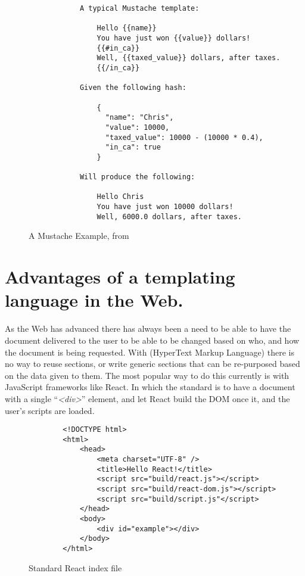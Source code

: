 \begin{figure}[ht!]
    \small
    \begin{verbatim}
            A typical Mustache template:

                Hello {{name}}
                You have just won {{value}} dollars!
                {{#in_ca}}
                Well, {{taxed_value}} dollars, after taxes.
                {{/in_ca}}

            Given the following hash:

                {
                  "name": "Chris",
                  "value": 10000,
                  "taxed_value": 10000 - (10000 * 0.4),
                  "in_ca": true
                }

            Will produce the following:

                Hello Chris
                You have just won 10000 dollars!
                Well, 6000.0 dollars, after taxes.
    \end{verbatim}
    \caption{A Mustache Example, from \parencite{MustacheMan}}
    \label{fig:mustacheEx}
\end{figure}
\clearpage



\section{Advantages of a templating language in the Web.}
As the Web has advanced there has always been a need to be able to have the document delivered to the user to be able to be changed based on who, and how the document is being requested. With (HyperText Markup Language) there is no way to reuse sections, or write generic sections that can be re-purposed based on the data given to them. The most popular way to do this currently is with JavaScript frameworks like React. In which the standard is to have a  document with a single ``\textit{<div>}'' element, and let React build the DOM once it, and the user's scripts are loaded.

\begin{figure}[ht!]
    \small
    \begin{verbatim}
        <!DOCTYPE html>
        <html>
            <head>
                <meta charset="UTF-8" />
                <title>Hello React!</title>
                <script src="build/react.js"></script>
                <script src="build/react-dom.js"></script>
                <script src="build/script.js"</script>
            </head>
            <body>
                <div id="example"></div>
            </body>
        </html>
    \end{verbatim}
    \caption{Standard React  index file}
\end{figure}

